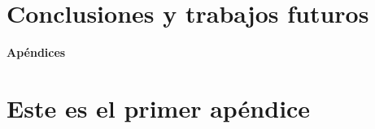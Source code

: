 \documentclass[12pt,twoside,titlepage]{report}
\newcommand\blankpage{%
    \newpage
    \null
    \thispagestyle{empty}%
    \newpage}
\begin{document}

\chapter{Conclusiones y trabajos futuros} \label{chap:conclusiones}



\blankpage






{}

\footnotesize{
%


}



\raggedbottom
\afterpage{\blankpage}

\newpage





\appendix

{}

\mbox{}
\vfill
\begin{center}
\begin{Huge}
\textbf{Apéndices}
\end{Huge}
\end{center}
\vfill
\mbox{}
\thispagestyle{empty}

\newpage
\mbox{}
\thispagestyle{empty}
\newpage


\chapter{Este es el primer apéndice} \label{chap:apendice}





\end{document}
